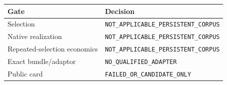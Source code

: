 \begin{tabular}{ll}
\toprule
Gate & Decision \\
\midrule
Selection & \texttt{NOT\_APPLICABLE\_PERSISTENT\_CORPUS} \\
Native realization & \texttt{NOT\_APPLICABLE\_PERSISTENT\_CORPUS} \\
Repeated-selection economics & \texttt{NOT\_APPLICABLE\_PERSISTENT\_CORPUS} \\
Exact bundle/adaptor & \texttt{NO\_QUALIFIED\_ADAPTER} \\
Public card & \texttt{FAILED\_OR\_CANDIDATE\_ONLY} \\
\bottomrule
\end{tabular}
